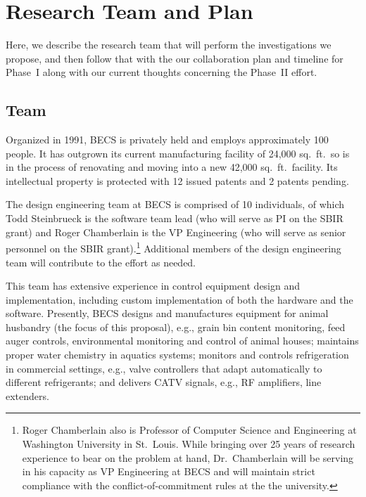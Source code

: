 \section{Research Team and Plan}
\label{sec:plan}

Here, we describe the research team that will
perform the investigations we propose, and then follow that with
the our collaboration plan and timeline for Phase~I along with
our current thoughts concerning the Phase~II effort.

\subsection{Team}

Organized in 1991, BECS is privately held and employs approximately 100
people. It has outgrown its current
manufacturing facility of 24,000 sq.~ft.\ so is in the process of
renovating and moving into a new 42,000 sq.~ft.\ facility.
Its intellectual property is protected with 12 issued patents and
2 patents pending.

The design engineering team at BECS is comprised of 10 individuals, of
which Todd Steinbrueck is the software team lead (who will serve as
PI on the SBIR grant) and Roger Chamberlain is the VP Engineering (who
will serve as senior personnel on the SBIR grant).\footnote{Roger Chamberlain
also is Professor of Computer Science and Engineering at Washington
University in St.~Louis. While bringing over 25 years of research
experience to bear on the problem at hand, Dr.~Chamberlain will be
serving in his capacity as VP Engineering at BECS and will maintain
strict compliance with the conflict-of-commitment rules at the the university.}
Additional members of the design engineering team will contribute to
the effort as needed. 

This team has extensive experience in control equipment design and
implementation, including custom implementation of both the hardware and
the software. Presently, BECS designs and manufactures equipment for
animal husbandry (the focus of this proposal),
e.g., grain bin content monitoring,
feed auger controls, environmental monitoring and control of animal houses;
maintains proper water chemistry in aquatics systems;
monitors and controls
refrigeration in commercial settings, e.g., valve controllers that adapt
automatically to different refrigerants;
and delivers CATV signals, e.g., RF amplifiers, line extenders.

